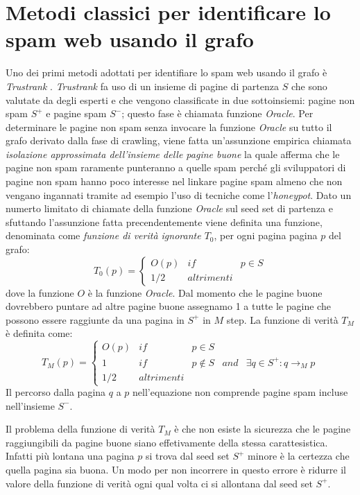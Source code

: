 \section{Metodi classici per identificare lo spam web usando il grafo}
Uno dei primi metodi adottati per identifiare lo spam web usando il grafo è \textit{Trustrank} \cite{Gyongyi:2004:CWS:1316689.1316740}. \textit{Trustrank} fa uso di un insieme di pagine di partenza \(S\) che sono valutate da degli esperti e che vengono classificate in due sottoinsiemi: pagine non spam \(S^+\) e pagine spam \(S^-\); questo fase è chiamata funzione \textit{Oracle}. Per determinare le pagine non spam senza invocare la funzione \textit{Oracle} su tutto il grafo derivato dalla fase di crawling, viene fatta un'assunzione empirica chiamata \textit{isolazione approssimata dell'insieme delle pagine buone} la quale afferma che le pagine non spam raramente punteranno a quelle spam perché gli sviluppatori di pagine non spam hanno poco interesse nel linkare pagine spam almeno che non vengano ingannati tramite ad esempio l'uso di tecniche come l'\textit{honeypot}. Dato un numerto limitato di chiamate della funzione \textit{Oracle} sul seed set di partenza e sfuttando l'assunzione fatta precendentemente 
viene definita una funzione, denominata come \textit{funzione di verità ignorante \(T_0\)}, per ogni pagina pagina \(p\) del grafo:
\begin{equation}
T_0(p)=\left\{
\begin{array}{ccc}
O(p) & if & p\in S \\
1/2 & altrimenti
\end{array}
\right .
\end{equation}
dove la funzione \(O\) è la funzione \textit{Oracle}. Dal momento che le pagine buone dovrebbero puntare ad altre pagine buone assegnamo 1 a tutte le pagine che possono essere raggiunte da una pagina in \(S^+\) in \(M\) step. La funzione di verità \(T_M\) è definita come:
\begin{equation}
T_M(p)=\left\{
\begin{array}{ccccc}
O(p) & if & p\in S \\
1 & if & p \not\in S & and & \exists q\in S^+:q\rightarrow_M p \\
1/2 & altrimenti
\end{array}
\right .
\end{equation}
Il percorso  dalla pagina \(q\) a \(p\) nell'equazione non comprende pagine spam incluse nell'insieme \(S^-\).

Il problema della funzione di verità \(T_M\) è che non esiste la sicurezza che le pagine raggiungibili da pagine buone siano effetivamente della stessa carattesistica. Infatti più lontana una pagina \(p\) si trova dal seed set \(S^+\) minore è la certezza che quella pagina sia buona. Un modo per non incorrere in questo errore è ridurre il valore della funzione di verità ogni qual volta ci si allontana dal seed set \(S^+\).

